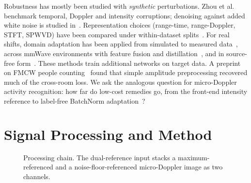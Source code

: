 \documentclass[11pt,a4paper]{article}
\begin{document}
Robustness has mostly been studied with \emph{synthetic} perturbations. Zhou et al.~\cite{zhou2024corruption} benchmark temporal, Doppler and intensity corruptions; denoising against added white noise is studied in~\cite{nguyen2024noise}. Representation choices (range-time, range-Doppler, STFT, SPWVD) have been compared under within-dataset splits~\cite{ayaz2025sp,ayaz2026bench}. For real shifts, domain adaptation has been applied from simulated to measured data~\cite{li2020uda}, across mmWave environments with feature fusion and distillation~\cite{li2025crossenv}, and in source-free form~\cite{liu2024sfda,si2025sfda}. These methods train additional networks on target data. A preprint on FMCW people counting~\cite{tanaka2025crossenv} found that simple amplitude preprocessing recovered much of the cross-room loss. We ask the analogous question for micro-Doppler activity recognition: how far do low-cost remedies go, from the front-end intensity reference to label-free BatchNorm adaptation~\cite{li2018adabn,wang2021tent}?

\section{Signal Processing and Method}\label{sec:method}
\begin{figure}[t]
\centering
{}
\caption{Processing chain. The dual-reference input stacks a maximum-referenced and a noise-floor-referenced micro-Doppler image as two channels.}
\label{fig:chain}
\end{figure}
\end{document}
